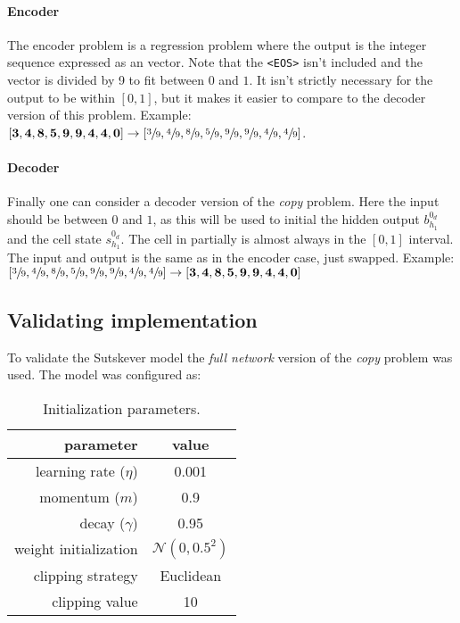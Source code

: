 \paragraph{Encoder} The encoder problem is a regression problem where the output is the integer sequence expressed as an vector. Note that the \texttt{<EOS>} isn't included and the vector is divided by 9 to fit between $0$ and $1$. It isn't strictly necessary for the output to be within $[0, 1]$, but it makes it easier to compare to the decoder version of this problem. Example: $[\mathbf{3}, \mathbf{4}, \mathbf{8}, \mathbf{5}, \mathbf{9}, \mathbf{9}, \mathbf{4}, \mathbf{4}, \mathbf{0}] \rightarrow [\sfrac{3}{9}, \sfrac{4}{9}, \sfrac{8}{9}, \sfrac{5}{9}, \sfrac{9}{9}, \sfrac{9}{9}, \sfrac{4}{9}, \sfrac{4}{9}]$.

\paragraph{Decoder} Finally one can consider a decoder version of the \textit{copy} problem. Here the input should be between $0$ and $1$, as this will be used to initial the hidden output $b_{h_1}^{0_d}$ and the cell state $s_{h_1}^{0_d}$. The cell in partially is almost always in the $[0, 1]$ interval. The input and output is the same as in the encoder case, just swapped. Example: $[\sfrac{3}{9}, \sfrac{4}{9}, \sfrac{8}{9}, \sfrac{5}{9}, \sfrac{9}{9}, \sfrac{9}{9}, \sfrac{4}{9}, \sfrac{4}{9}] \rightarrow [\mathbf{3}, \mathbf{4}, \mathbf{8}, \mathbf{5}, \mathbf{9}, \mathbf{9}, \mathbf{4}, \mathbf{4}, \mathbf{0}]$

\subsection{Validating implementation}

To validate the Sutskever model the \textit{full network} version of the \textit{copy} problem was used. The model was configured as:

\begin{table}[H]
\centering
\begin{tabular}{r|c}
	parameter & value \\ \hline
	learning rate ($\eta$) & 0.001 \\
	momentum ($m$) & 0.9 \\
	decay ($\gamma$) & 0.95 \\
	weight initialization & $\mathcal{N}(0, 0.5^2)$ \\
	clipping strategy & Euclidean \\
	clipping value & 10
\end{tabular}
\caption{Initialization parameters.}
\end{table}

